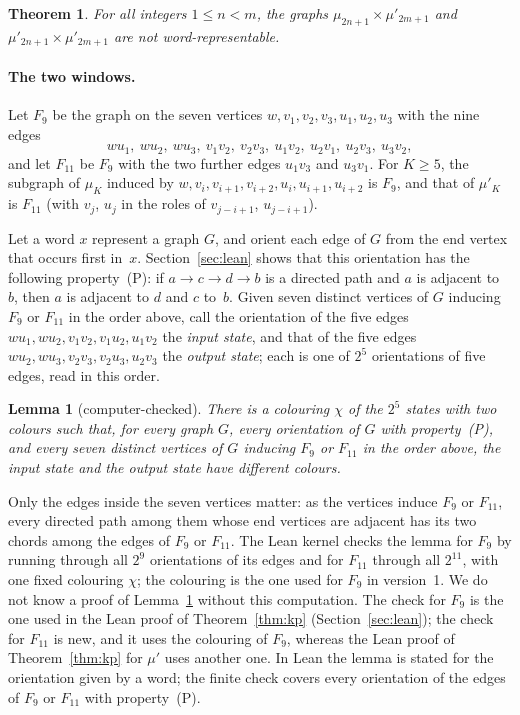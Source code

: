 \documentclass[11pt]{article}
\newtheorem{theorem}{Theorem}
\newtheorem{lemma}{Lemma}[section]
\theoremstyle{remark}
\begin{document}
\begin{theorem}\label{thm:two}
For all integers $1\le n<m$, the graphs $\mu_{2n+1}\times\mu'_{2m+1}$ and
$\mu'_{2n+1}\times\mu'_{2m+1}$ are not word-representable.
\end{theorem}

\paragraph{The two windows.}
Let $F_9$ be the graph on the seven vertices
$w,v_1,v_2,v_3,u_1,u_2,u_3$ with the nine edges
\[
wu_1,\ wu_2,\ wu_3,\ v_1v_2,\ v_2v_3,\ u_1v_2,\ u_2v_1,\ u_2v_3,\ u_3v_2,
\]
and let $F_{11}$ be $F_9$ with the two further edges $u_1v_3$ and $u_3v_1$.
For $K\ge5$, the subgraph of $\mu_K$ induced by $w,v_i,v_{i+1},v_{i+2},
u_i,u_{i+1},u_{i+2}$ is $F_9$, and that of $\mu'_K$ is $F_{11}$ (with $v_j$,
$u_j$ in the roles of $v_{j-i+1}$, $u_{j-i+1}$).

Let a word $x$ represent a graph $G$, and orient each edge of $G$ from the end
vertex that occurs first in~$x$. Section~\ref{sec:lean} shows that this
orientation has the following property~(P): if $a\to c\to d\to b$ is a
directed path and $a$ is adjacent to~$b$, then $a$ is adjacent to $d$ and $c$
to~$b$. Given seven distinct vertices of $G$ inducing $F_9$ or $F_{11}$ in the
order above, call the orientation of the five edges
$wu_1,wu_2,v_1v_2,v_1u_2,u_1v_2$ the \emph{input state}, and that of the five
edges $wu_2,wu_3,v_2v_3,v_2u_3,u_2v_3$ the \emph{output state}; each is one of
$2^5$ orientations of five edges, read in this order.

\begin{lemma}[computer-checked]\label{lem:window}
There is a colouring $\chi$ of the $2^5$ states with two colours such that, for
every graph $G$, every orientation of $G$ with property~(P), and every
seven distinct vertices of $G$ inducing $F_9$ or $F_{11}$ in the order above, the input state and
the output state have different colours.
\end{lemma}

Only the edges inside the seven vertices matter: as the vertices induce $F_9$
or $F_{11}$, every directed path among them whose end vertices are adjacent
has its two chords among the edges of $F_9$ or $F_{11}$. The Lean kernel checks
the lemma for $F_9$ by running through all $2^9$ orientations of its edges and
for $F_{11}$ through all $2^{11}$, with one fixed colouring $\chi$; the
colouring is the one used for $F_9$ in version~1. We do not know a proof of Lemma~\ref{lem:window} without this
computation. The check for $F_9$ is the one used in the Lean proof of
Theorem~\ref{thm:kp} (Section~\ref{sec:lean}); the check for $F_{11}$ is new,
and it uses the colouring of $F_9$, whereas the Lean proof of
Theorem~\ref{thm:kp} for $\mu'$ uses another one. In Lean the lemma is stated
for the orientation given by a word; the finite check covers every orientation
of the edges of $F_9$ or $F_{11}$ with property~(P).
\end{document}
